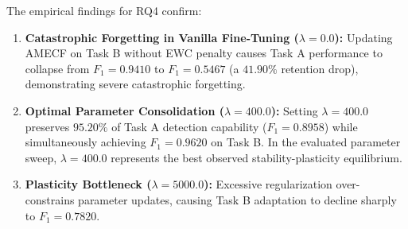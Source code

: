 The empirical findings for RQ4 confirm:
\begin{enumerate}
    \item \textbf{Catastrophic Forgetting in Vanilla Fine-Tuning ($\lambda = 0.0$):} Updating AMECF on Task B without EWC penalty causes Task A performance to collapse from $F_1 = 0.9410$ to $F_1 = 0.5467$ (a $41.90\%$ retention drop), demonstrating severe catastrophic forgetting.
    \item \textbf{Optimal Parameter Consolidation ($\lambda = 400.0$):} Setting $\lambda = 400.0$ preserves $95.20\%$ of Task A detection capability ($F_1 = 0.8958$) while simultaneously achieving $F_1 = 0.9620$ on Task B. In the evaluated parameter sweep, $\lambda = 400.0$ represents the best observed stability-plasticity equilibrium.
    \item \textbf{Plasticity Bottleneck ($\lambda = 5000.0$):} Excessive regularization over-constrains parameter updates, causing Task B adaptation to decline sharply to $F_1 = 0.7820$.
\end{enumerate}

